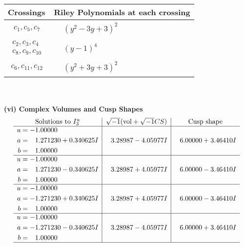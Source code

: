 \documentclass[1p]{elsarticle_modified}
\theoremstyle{definition}
\newcommand{\I}{\sqrt{-1}}
\begin{document}
\begin{tabular}{m{50pt}|m{274pt}}
Crossings & \hspace{64pt}Riley Polynomials at each crossing \\
\hline $$\begin{aligned}c_{1},c_{5},c_{7}\end{aligned}$$&$\begin{aligned}
&(y^2-3 y+3)^2
\end{aligned}$\\
\hline $$\begin{aligned}c_{2},c_{3},c_{4}\\c_{8},c_{9},c_{10}\end{aligned}$$&$\begin{aligned}
&(y-1)^4
\end{aligned}$\\
\hline $$\begin{aligned}c_{6},c_{11},c_{12}\end{aligned}$$&$\begin{aligned}
&(y^2+3 y+3)^2
\end{aligned}$\\
\hline
\end{tabular}\\~\\
\newpage\flushleft \textbf{(vi) Complex Volumes and Cusp Shapes}
$$\begin{array}{c|c|c}  
\text{Solutions to }I^u_{3}& \I (\text{vol} + \sqrt{-1}CS) & \text{Cusp shape}\\
 \hline 
\begin{aligned}
u &= -1.00000\phantom{ +0.000000I} \\
a &= \phantom{-}1.271230 + 0.340625 I \\
b &= \phantom{-}1.00000\phantom{ +0.000000I}\end{aligned}
 & \phantom{-}3.28987 - 4.05977 I & \phantom{-}6.00000 + 3.46410 I \\ \hline\begin{aligned}
u &= -1.00000\phantom{ +0.000000I} \\
a &= \phantom{-}1.271230 - 0.340625 I \\
b &= \phantom{-}1.00000\phantom{ +0.000000I}\end{aligned}
 & \phantom{-}3.28987 + 4.05977 I & \phantom{-}6.00000 - 3.46410 I \\ \hline\begin{aligned}
u &= -1.00000\phantom{ +0.000000I} \\
a &= -1.271230 + 0.340625 I \\
b &= \phantom{-}1.00000\phantom{ +0.000000I}\end{aligned}
 & \phantom{-}3.28987 + 4.05977 I & \phantom{-}6.00000 - 3.46410 I \\ \hline\begin{aligned}
u &= -1.00000\phantom{ +0.000000I} \\
a &= -1.271230 - 0.340625 I \\
b &= \phantom{-}1.00000\phantom{ +0.000000I}\end{aligned}
 & \phantom{-}3.28987 - 4.05977 I & \phantom{-}6.00000 + 3.46410 I\\
 \hline 
 \end{array}$$\newpage\newpage\renewcommand{\arraystretch}{1}
\end{document}
